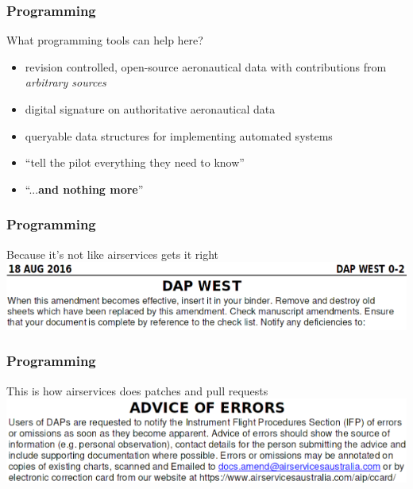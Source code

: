 \begin{frame}
\frametitle{Programming}
\begin{block}{What programming tools can help here?}
\begin{itemize}
\item<1-> revision controlled, open-source aeronautical data with contributions from \emph{arbitrary sources}
\item<2-> digital signature on authoritative aeronautical data
\item<3-> queryable data structures for implementing automated systems
\item<4-> ``tell the pilot everything they need to know''
\item<4-> ``...\textbf{and nothing more}''
\end{itemize}
\end{block}
\end{frame}

\begin{frame}
\frametitle{Programming}
\begin{block}{Because it's not like airservices gets it right}
\includegraphics[height=0.18\textheight]{image/dap-amendment.png}
\end{block}
\end{frame}

\begin{frame}
\frametitle{Programming}
\begin{block}{This is how airservices does patches and pull requests}
\includegraphics[height=0.2\textheight]{image/dap-errors.png}
\end{block}
\end{frame}

